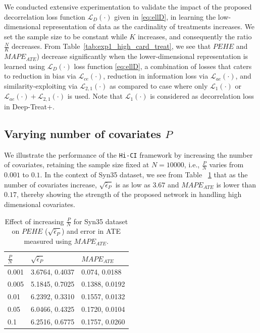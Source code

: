 \documentclass[twoside,11pt]{article}
\begin{document}
We conducted extensive experimentation to validate the impact of the proposed decorrelation loss function $\mathcal{L}_{D}(\cdot)$ given in \eqref{eq:ellD}, in learning the low-dimensional representation of data as the cardinality of treatments increases. We set the sample size to be  constant while $K$ increases, and consequently the ratio $\frac{N}{K}$ decreases. From Table~\ref{tab:exp1_high_card_treat}, we see that $PEHE$  and $MAPE_{ATE}$) decrease significantly when the lower-dimensional representation is learned using $\mathcal{L}_D(\cdot)$ loss function \eqref{eq:ellD}, a combination of losses that caters to reduction in bias via $\mathcal{L}_{ce}(\cdot)$, reduction in information loss via $\mathcal{L}_{ae}(\cdot)$, and similarity-exploiting via $\mathcal{L}_{2,1}(\cdot)$ as compared to case where only $\mathcal{L}_{1}(\cdot)$ or $\mathcal{L}_{ae}(\cdot) + \mathcal{L}_{2,1}(\cdot)$ is used. Note that $\mathcal{L}_{1}(\cdot)$ is considered as decorrelation loss in Deep-Treat+.

\subsection{Varying number of covariates $P$}
We illustrate the performance of the \texttt{Hi-CI} framework by increasing the number of covariates, retaining the sample size fixed at $N=10000$, i.e., $\frac{P}{N}$ varies from $0.001$ to $0.1$. In the context of \textsf{Syn35} dataset, we see from Table~ \ref{tab:exp3_noisy_covariates} that as the number of covariates increase, $\sqrt{\hat\epsilon_{P}}$ is as low as $3.67$ and $MAPE_{ATE}$ is lower than $0.17$, thereby showing the strength of the proposed network in handling high dimensional covariates.
\begin{table}[h]
\centering
\caption{Effect of increasing $\frac{P}{N}$ for \textsf{Syn35} dataset on $PEHE$ ($\sqrt{\hat\epsilon_{P}}$) and error in ATE measured using $MAPE_{ATE}$.}
 \label{tab:exp3_noisy_covariates}
  \begin{tabular}{l|l|l}
    \hline
    $\frac{P}{N}$ & $\sqrt{\hat\epsilon_{P}}$ & $MAPE_{ATE}$\\
    \hline
    0.001 & 3.6764, 0.4037 & 0.074, 0.0188\\ 
    0.005 & 5.1845, 0.7025 & 0.1388, 0.0192\\ 
    0.01 & 6.2392, 0.3310 & 0.1557, 0.0132\\ 
    0.05 & 6.0466, 0.4325 & 0.1720, 0.0104\\ 
    0.1 & 6.2516, 0.6775 & 0.1757, 0.0260\\ 
    \hline
\end{tabular}
\end{table}
\end{document}
